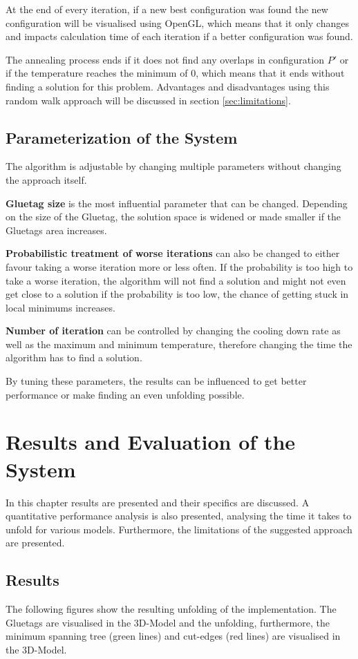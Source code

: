 \documentclass[draft,final]{vutinfth} %
\begin{document}
At the end of every iteration, if a new best configuration was found the new configuration will be visualised using OpenGL, which means that it only changes and impacts calculation time of each iteration if a better configuration was found. 

The annealing process ends if it does not find any overlaps in configuration $P'$ or if the temperature reaches the minimum of $0$, which means that it ends without finding a solution for this problem. Advantages and disadvantages using this random walk approach will be discussed in section \ref{sec:limitations}.

\section{Parameterization of the System}
The algorithm is adjustable by changing multiple parameters without changing the approach itself.

\textbf{Gluetag size} is the most influential parameter that can be changed. Depending on the size of the Gluetag, the solution space is widened or made smaller if the Gluetags area increases.

\textbf{Probabilistic treatment of worse iterations} can also be changed to either favour taking a worse iteration more or less often. If the probability is too high to take a worse iteration, the algorithm will not find a solution and might not even get close to a solution if the probability is too low, the chance of getting stuck in local minimums increases.

\textbf{Number of iteration} can be controlled by changing the cooling down rate as well as the maximum and minimum temperature, therefore changing the time the algorithm has to find a solution.

By tuning these parameters, the results can be influenced to get better performance or make finding an even unfolding possible.

\chapter{Results and Evaluation of the System}
\label{chap:reseval}
In this chapter results are presented and their specifics are discussed. A quantitative performance analysis is also presented, analysing the time it takes to unfold for various models. Furthermore, the limitations of the suggested approach are presented.

\section{Results}
The following figures show the resulting unfolding of the implementation. The Gluetags are visualised in the 3D-Model and the unfolding, furthermore, the minimum spanning tree (green lines) and cut-edges (red lines) are visualised in the 3D-Model.
\end{document}
